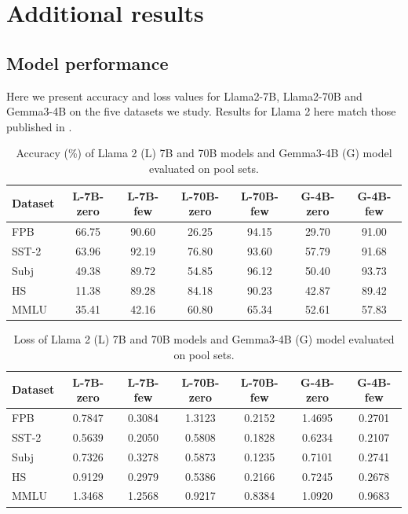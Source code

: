 \section{Additional results}\label{sec:extra_results}


\subsection{Model performance}

Here we present accuracy and loss values for Llama2-7B, Llama2-70B and Gemma3-4B on the five datasets we study.
Results for Llama 2 here match those published in \citet{kossen2024context}.


\begin{table}[h]
    \centering
    \small
    \begin{tabular}{l c c c c c c}
        \toprule
        Dataset & L-7B-zero & L-7B-few & L-70B-zero & L-70B-few & G-4B-zero & G-4B-few\\
        \midrule
        FPB & 66.75 & 90.60 & 26.25 & 94.15 & 29.70 & 91.00\\
        SST-2  & 63.96 & 92.19 & 76.80 & 93.60 & 57.79 & 91.68\\
        Subj & 49.38 & 89.72 & 54.85 & 96.12& 50.40 & 93.73\\
        HS & 11.38 & 89.28 & 84.18 & 90.23 & 42.87 & 89.42\\
        MMLU & 35.41 & 42.16 & 60.80 & 65.34 & 52.61 & 57.83 \\
       \bottomrule
    \end{tabular}
    \vspace{1em}
    \caption{Accuracy (\%) of Llama 2 (L) 7B and 70B models and Gemma3-4B (G) model evaluated on pool sets.}
    \label{tab:accuracy_models}
\end{table}


\begin{table}[h]
    \centering
    \small
    \begin{tabular}{l c c c c c c}
        \toprule
        Dataset & L-7B-zero & L-7B-few & L-70B-zero & L-70B-few & G-4B-zero & G-4B-few\\
        \midrule
        FPB & 0.7847 & 0.3084 & 1.3123 & 0.2152 & 1.4695 & 0.2701\\
        SST-2  & 0.5639 & 0.2050 & 0.5808 & 0.1828 & 0.6234 & 0.2107\\
        Subj & 0.7326 & 0.3278 & 0.5873 & 0.1235&0.7101 & 0.2741\\
        HS & 0.9129 & 0.2979 & 0.5386 & 0.2166 &0.7245 & 0.2678\\
        MMLU & 1.3468 & 1.2568 & 0.9217 & 0.8384 & 1.0920 & 0.9683 \\
        \bottomrule
    \end{tabular}
    \vspace{1em}
    \caption{Loss of Llama 2 (L) 7B and 70B models and Gemma3-4B (G) model evaluated on pool sets.}
    \label{tab:loss_models}
\end{table}


